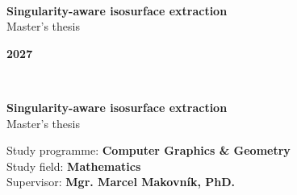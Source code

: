 

\thispagestyle{empty} %

\begin{center}
\textsc{\Large \skola} \\ %
\bigskip
\textsc{\Large \fakulta}
\end{center}

\vspace{9cm}
\begin{center}
\textbf{\Huge Singularity-aware isosurface extraction}\\  %
\bigskip
\Large Master's thesis %
\end{center}

\vfill
\textbf{2027 \hfill \autor}  %

\newpage



\thispagestyle{empty}
\begin{center}
\textsc{\Large \skola} \\
\bigskip
\textsc{\Large \fakulta}
\end{center}

\vspace{9cm}
\begin{center}
\textbf{\Huge Singularity-aware isosurface extraction}\\ %
\bigskip
\Large Master's thesis
\end{center}

\vfill

Study programme:  \textbf{Computer Graphics \& Geometry } \\
\indent  Study field: \hspace{1.1cm} \textbf{Mathematics} \\   \indent Supervisor: \hspace{1.15cm}  \textbf{Mgr. Marcel Makovník, PhD.}\\ %

